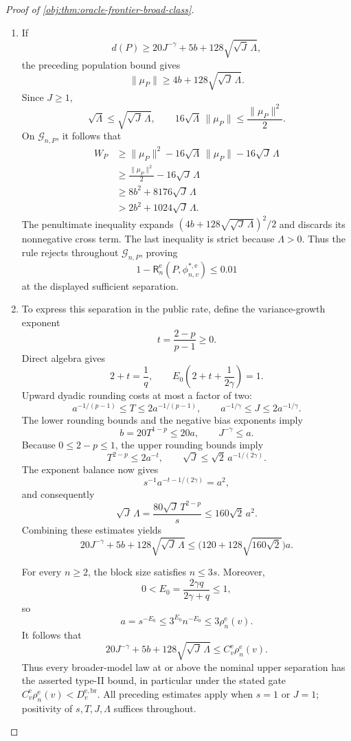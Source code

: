 \documentclass[11pt]{article}
\begin{document}
\begin{proof}[Proof of \cref{obj:thm:oracle-frontier-broad-class}]
\begin{enumerate}
\item If
\[
d(P)\ge20J^{-\gamma}+5b+128\sqrt{\sqrt J\,\Lambda},
\]
the preceding population bound gives
\[
\|\mu_P\|\ge4b+128\sqrt{\sqrt J\,\Lambda}.
\]
Since \(J\ge1\),
\[
\sqrt\Lambda\le\sqrt{\sqrt J\,\Lambda},
\qquad
16\sqrt\Lambda\,\|\mu_P\|\le\frac{\|\mu_P\|^2}{2}.
\]
On \(\mathcal G_{n,P}\), it follows that
\[
\begin{aligned}
W_P
&\ge\|\mu_P\|^2
-16\sqrt\Lambda\,\|\mu_P\|-16\sqrt J\,\Lambda\\
&\ge\frac{\|\mu_P\|^2}{2}-16\sqrt J\,\Lambda\\
&\ge8b^2+8176\sqrt J\,\Lambda\\
&>2b^2+1024\sqrt J\,\Lambda.
\end{aligned}
\]
The penultimate inequality expands
\((4b+128\sqrt{\sqrt J\,\Lambda})^2/2\) and discards its nonnegative cross term. The last inequality is strict because \(\Lambda>0\). Thus the rule rejects throughout \(\mathcal G_{n,P}\), proving
\[
1-\mathsf R_n^{\mathrm e}(P,\phi^{*,\mathrm e}_{n,v})\le0.01
\]
at the displayed sufficient separation.

\item To express this separation in the public rate, define the variance-growth exponent
\[
t=\frac{2-p}{p-1}\ge0.
\]
Direct algebra gives
\[
2+t=\frac1q,
\qquad
E_0\left(2+t+\frac1{2\gamma}\right)=1.
\]
Upward dyadic rounding costs at most a factor of two:
\[
a^{-1/(p-1)}\le T\le2a^{-1/(p-1)},
\qquad
a^{-1/\gamma}\le J\le2a^{-1/\gamma}.
\]
The lower rounding bounds and the negative bias exponents imply
\[
b=20T^{1-p}\le20a,
\qquad
J^{-\gamma}\le a.
\]
Because \(0\le2-p\le1\), the upper rounding bounds imply
\[
T^{2-p}\le2a^{-t},
\qquad
\sqrt J\le\sqrt2\,a^{-1/(2\gamma)}.
\]
The exponent balance now gives
\[
s^{-1}a^{-t-1/(2\gamma)}=a^2,
\]
and consequently
\[
\sqrt J\,\Lambda
=\frac{80\sqrt J\,T^{2-p}}s
\le160\sqrt2\,a^2.
\]
Combining these estimates yields
\[
20J^{-\gamma}+5b+128\sqrt{\sqrt J\,\Lambda}
\le
\bigl(120+128\sqrt{160\sqrt2}\bigr)a.
\]

For every \(n\ge2\), the block size satisfies \(n\le3s\). Moreover,
\[
0<E_0=\frac{2\gamma q}{2\gamma+q}\le1,
\]
so
\[
a=s^{-E_0}
\le3^{E_0}n^{-E_0}
\le3\rho_n^{\mathrm e}(v).
\]
It follows that
\[
20J^{-\gamma}+5b+128\sqrt{\sqrt J\,\Lambda}
\le C_v^{\mathrm e}\rho_n^{\mathrm e}(v).
\]
Thus every broader-model law at or above the nominal upper separation has the asserted type-II bound, in particular under the stated gate
\(C_v^{\mathrm e}\rho_n^{\mathrm e}(v)<D_v^{\mathrm{e,br}}\).
All preceding estimates apply when \(s=1\) or \(J=1\); positivity of \(s,T,J,\Lambda\) suffices throughout.


\end{enumerate}
\end{proof}
\end{document}
